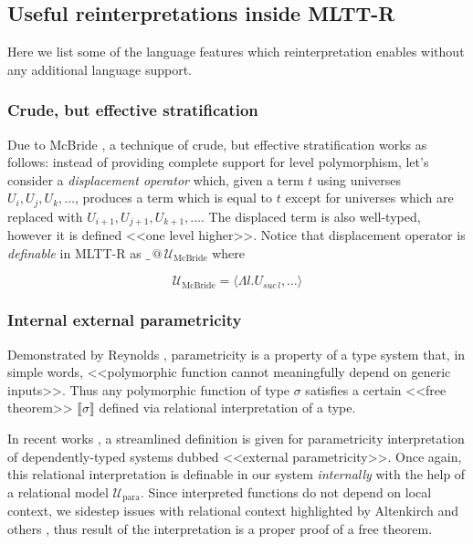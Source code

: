 \documentclass[acmsmall, review, screen, authorversion]{acmart}
\begin{document}
\subsection{Useful reinterpretations inside MLTT-R}
\label{MLTT-R-applications}

Here we list some of the language features which reinterpretation
enables without any additional language support.

\subsubsection{Crude, but effective stratification}
\label{MLTT-R-displacement}

Due to McBride \cite{McBride:Crude2002}, a technique of crude, but
effective stratification works as follows: instead of providing
complete support for level polymorphism, let's consider a
\textit{displacement operator} which, given a term $t$ using
universes $U_i,U_j,U_k,\ldots$, produces a term which is equal to $t$
except for universes which are replaced with
$U_{i+1},U_{j+1},U_{k+1},\ldots$. The displaced term is also
well-typed, however it is defined <<one level higher>>. Notice that
displacement operator is \textit{definable} in MLTT-R as
$\_\,@\,\mathcal{U}_\mathrm{McBride}$ where

\[\mathcal{U}_\mathrm{McBride} = \langle
  \Lambda l.U_{suc\,l}, \ldots
\rangle\]

\subsubsection{Internal external parametricity}
\label{MLTT-R-parametricity}

Demonstrated by Reynolds \cite{reynolds1983types}, parametricity is a
property of a type system that, in simple words, <<polymorphic
function cannot meaningfully depend on generic inputs>>. Thus any
polymorphic function of type $\sigma$ satisfies a certain <<free
theorem>> $\llbracket \sigma \rrbracket$ defined via relational
interpretation of a type.

In recent works \cite{Bernardy:Parametricity2010}
\cite{Altenkirch:Parametricity2024}, a streamlined definition is
given for parametricity interpretation of dependently-typed systems
dubbed <<external parametricity>>. Once again, this relational
interpretation is definable in our system \textit{internally} with
the help of a relational model $\mathcal{U}_\mathrm{para}$. Since
interpreted functions do not depend on local context, we sidestep
issues with relational context highlighted by Altenkirch and others
\cite{Altenkirch:Parametricity2024}, thus result of the
interpretation is a proper proof of a free theorem.
\end{document}

